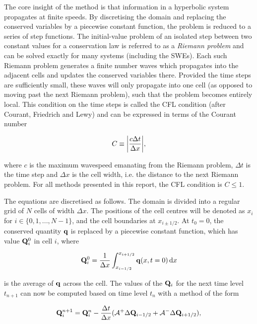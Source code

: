 The core insight of the method is that information in a hyperbolic system propagates at finite speeds. By discretising the domain and replacing the conserved variables by a piecewise constant function, the problem is reduced to a series of step functions. The initial-value problem of an isolated step between two constant values for a conservation law is referred to as a \emph{Riemann problem} and can be solved exactly for many systems (including the SWEs). Each such Riemann problem generates a finite number waves which propagates into the adjacent cells and updates the conserved variables there. Provided the time steps are sufficiently small, these waves will only propagate into one cell (as opposed to moving past the next Riemann problem), such that the problem becomes entirely local. This condition on the time steps is called the CFL condition (after Courant, Friedrich and Lewy) and can be expressed in terms of the Courant number

\begin{equation}
  C \equiv \qty|\frac{c \Delta t}{\Delta x}|,
\end{equation}

where $c$ is the maximum wavespeed emanating from the Riemann problem, $\Delta t$ is the time step and $\Delta x$ is the cell width, i.e. the distance to the next Riemann problem. For all methods presented in this report, the CFL condition is $C \leq 1$.

The equations are discretised as follows. The domain is divided into a regular grid of $N$ cells of width $\Delta x$. The positions of the cell centres will be denoted as $x_i$ for $i \in \{0, 1, ..., N-1\}$, and the cell boundaries at $x_{i \pm 1/2}$. At $t_0 = 0$, the conserved quantity $\vb q$ is replaced by a piecewise constant function, which has value $\vb Q_i^0$ in cell $i$, where

\begin{equation}
  \vb Q_i^0 = \frac{1}{\Delta x} \int_{x_{i-1/2}}^{x_{i+1/2}} \vb q(x, t=0)\,\dd x
\end{equation}

is the average of $\vb q$ across the cell. The values of the $\vb Q_i$ for the next time level $t_{n+1}$ can now be computed based on time level $t_n$ with a method of the form

\begin{equation}
\label{eq:wpf}
  \vb Q_i^{n+1} = \vb Q_i^n - \frac{\Delta t}{\Delta x} (\mathcal{A}^+ \Delta \vb Q_{i-1/2} + \mathcal{A}^- \Delta \vb Q_{i+1/2}),
\end{equation}

